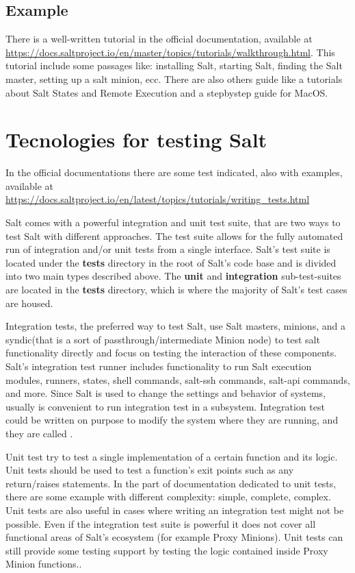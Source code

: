 \documentclass[12pt,a4paper,openright,twoside]{book}
\begin{document}
\subsection{Example}
There is a well-written tutorial in the official documentation, available at \url{https://docs.saltproject.io/en/master/topics/tutorials/walkthrough.html}.
This tutorial include some passages like: installing Salt, starting Salt, finding the Salt master, setting up a salt minion, ecc.
There are also others guide like a tutorials about Salt States and Remote Execution and a stepbystep guide for MacOS.

\section{Tecnologies for testing Salt}
In the official documentations there are some test indicated, also with examples, available at 
\url{https://docs.saltproject.io/en/latest/topics/tutorials/writing_tests.html}


Salt comes with a powerful integration and unit test suite, that are two ways to test Salt with different approaches.
The test suite allows for the fully automated run of integration and/or unit tests from a single interface.
Salt's test suite is located under the \textbf{tests} directory in the root of Salt's code base and is divided into two main types described above.
The \textbf{unit} and \textbf{integration} sub-test-suites are located in the \textbf{tests} directory, which is where the majority of Salt's test cases are housed.\cite{saltDocTest}


Integration tests, the preferred way to test Salt, use Salt masters, minions, and a syndic(that is a sort of passthrough/intermediate Minion node) to test salt functionality directly and focus on testing the interaction of these components.
Salt's integration test runner includes functionality to run Salt execution modules, runners, states, shell commands, salt-ssh commands, salt-api commands, and more.
Since Salt is used to change the settings and behavior of systems, usually is convenient to run integration test in a subsystem.
Integration test could be written on purpose to modify the system where they are running, and they are called \cite{saltDocTest}.


Unit test try to test a single implementation of a certain function and its logic. Unit tests should be used to test a function's exit points such as any return/raises statements.
In the part of documentation dedicated to unit tests, there are some example with different complexity: simple, complete, complex.
Unit tests are also useful in cases where writing an integration test might not be possible.
Even if the integration test suite is powerful it does not cover all functional areas of Salt's ecosystem (for example Proxy Minions).
Unit tests can still provide some testing support by testing the logic contained inside Proxy Minion functions.\cite{saltDocTest}.
\end{document}
